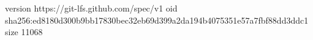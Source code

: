 version https://git-lfs.github.com/spec/v1
oid sha256:ed8180d300b9bb17830bec32eb69d399a2da194b4075351e57a7fbf88dd3ddc1
size 11068
